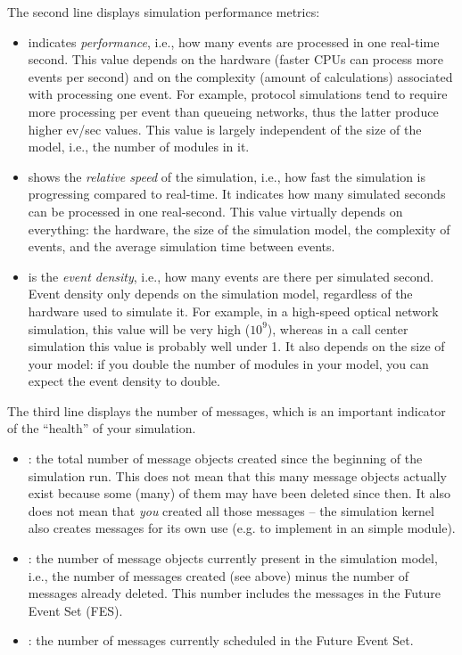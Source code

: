The second line displays simulation performance metrics:

\begin{itemize}
   \item {} indicates \textit{performance}, i.e., how many events are
     processed in one real-time second. This value depends on the hardware
     (faster CPUs can process more events per second) and on the complexity
     (amount of calculations) associated with processing one event. For example,
     protocol simulations tend to require more processing per event than queueing
     networks, thus the latter produce higher ev/sec values. This value is largely
     independent of the size of the model, i.e., the number of modules in it.
   \item {} shows the \textit{relative speed} of the simulation, i.e.,
     how fast the simulation is progressing compared to real-time. It indicates how many
     simulated seconds can be processed in one real-second. This value virtually depends
     on everything: the hardware, the size of the simulation model, the complexity of events,
     and the average simulation time between events.
   \item {} is the \textit{event density}, i.e., how many events are
     there per simulated second. Event density only depends on the simulation model,
     regardless of the hardware used to simulate it. For example, in a high-speed
     optical network simulation, this value will be very high ($10^9$), whereas
     in a call center simulation this value is probably well under 1. It also
     depends on the size of your model: if you double the number of modules in
     your model, you can expect the event density to double.
\end{itemize}

The third line displays the number of messages, which is an important
indicator of the ``health'' of your simulation.

\begin{itemize}
   \item{: the total number of message objects created since the
     beginning of the simulation run. This does not mean that this many message
     objects actually exist because some (many) of them may have been deleted
     since then. It also does not mean that \textit{you} created all those
     messages -- the simulation kernel also creates messages for its own use
     (e.g. to implement  in an  simple module).}
   \item{: the number of message objects currently present
     in the simulation model, i.e., the number of messages created (see above)
     minus the number of messages already deleted. This number includes
     the messages in the Future Event Set (FES).}
   \item{: the number of messages currently scheduled in the
     Future Event Set.}
\end{itemize}


